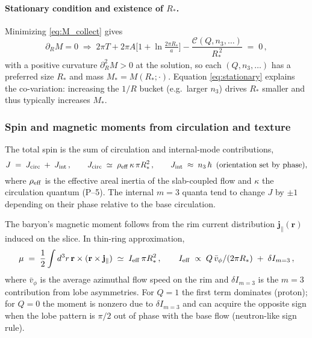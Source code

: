 \paragraph{Stationary condition and existence of $R_\ast$.}
Minimizing \eqref{eq:M_collect} gives
\begin{equation}
\boxed{\;
\partial_R M=0 \;\Rightarrow\;
2\pi T
+ 2\pi A\Big[1+\ln\!\tfrac{2\pi R_\ast}{a}\Big]
- \frac{\mathcal C(Q,n_3,\ldots)}{R_\ast^{\,2}}
\;=\;0\,,
\;}
\label{eq:stationary}
\end{equation}
with a positive curvature $\partial_R^2 M>0$ at the solution, so each $(Q,n_3,\ldots)$ has a preferred size $R_\ast$ and mass $M_\ast=M(R_\ast;\cdot)$.
Equation \eqref{eq:stationary} explains the co-variation: increasing the $1/R$ bucket (e.g.\ larger $n_3$) drives $R_\ast$ smaller and thus typically increases $M_\ast$.

\subsubsection{Spin and magnetic moments from circulation and texture}
\label{sec:baryons-inside:spin-mu}
The total spin is the sum of circulation and internal-mode contributions,
\begin{equation}
J \;=\; J_{\rm circ} \;+\; J_{\rm int}\,,
\qquad
J_{\rm circ}\;\simeq\; \rho_{\rm eff}\,\kappa\,\pi R_\ast^2\,,
\qquad
J_{\rm int}\;\approx\; n_3\,\hbar\;\;(\text{orientation set by phase}),
\label{eq:Jbudget}
\end{equation}
where $\rho_{\rm eff}$ is the effective areal inertia of the slab-coupled flow and $\kappa$ the circulation quantum (P--5).
The internal $m{=}3$ quanta tend to change $J$ by $\pm1$ depending on their phase relative to the base circulation.

The baryon’s magnetic moment follows from the rim current distribution $\mathbf j_\parallel(\mathbf r)$ induced on the slice.
In thin-ring approximation,
\begin{equation}
\mu \;=\; \frac{1}{2}\int d^3r\,\mathbf r\times (\mathbf r\times \mathbf j_\parallel)
\;\simeq\; I_{\rm eff}\,\pi R_\ast^2\,,
\qquad
I_{\rm eff}\;\propto\; Q\,\bar v_\phi/(2\pi R_\ast)\;+\; \delta I_{m{=}3}\,,
\label{eq:mu}
\end{equation}
where $\bar v_\phi$ is the average azimuthal flow speed on the rim and $\delta I_{m{=}3}$ is the $m{=}3$ contribution from lobe asymmetries.
For $Q\!=\!1$ the first term dominates (proton); for $Q\!=\!0$ the moment is nonzero due to $\delta I_{m{=}3}$ and can acquire the opposite sign when the lobe pattern is $\pi/2$ out of phase with the base flow (neutron-like sign rule).

